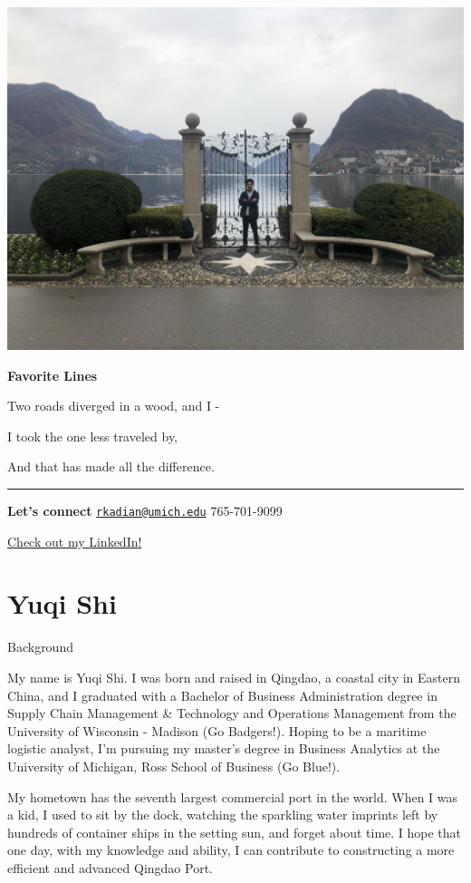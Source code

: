 \documentclass[
]{book}
\begin{document}
\includegraphics{raj.jpg}

\textbf{Favorite Lines}

Two roads diverged in a wood, and I -

I took the one less traveled by,

And that has made all the difference.

\begin{center}\rule{0.5\linewidth}{0.5pt}\end{center}

\textbf{Let's connect}
\href{mailto:rkadian@umich.edu}{\nolinkurl{rkadian@umich.edu}} \textbar{} 765-701-9099

\href{https://www.linkedin.com/in/kadian}{Check out my LinkedIn!}

\hypertarget{yuqi-shi}{%
\section{Yuqi Shi}\label{yuqi-shi}}

Background

My name is Yuqi Shi. I was born and raised in Qingdao, a coastal city in Eastern China, and I graduated with a Bachelor of Business Administration degree in Supply Chain Management \& Technology and Operations Management from the University of Wisconsin - Madison (Go Badgers!). Hoping to be a maritime logistic analyst, I'm pursuing my master's degree in Business Analytics at the University of Michigan, Ross School of Business (Go Blue!).

My hometown has the seventh largest commercial port in the world. When I was a kid, I used to sit by the dock, watching the sparkling water imprints left by hundreds of container ships in the setting sun, and forget about time. I hope that one day, with my knowledge and ability, I can contribute to constructing a more efficient and advanced Qingdao Port.
\end{document}
